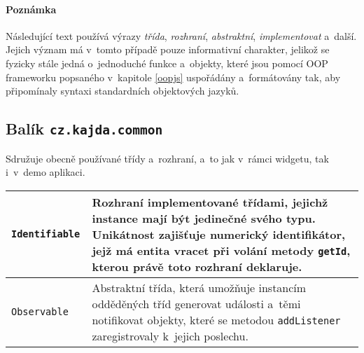 			\paragraph{Poznámka} Následující text používá výrazy \emph{třída}, \emph{rozhraní}, \emph{abstraktní}, \emph{implementovat} a~další. Jejich význam má v~tomto případě pouze informativní charakter, jelikož se fyzicky stále jedná o~jednoduché funkce a~objekty, které jsou pomocí OOP frameworku popsaného v~kapitole \ref{oopjs} uspořádány a~formátovány tak, aby připomínaly syntaxi standardních objektových jazyků.
			
		
			\pagebreak
			\subsection{Balík {\tt cz.kajda.common}}
				Sdružuje obecně používané třídy a~rozhraní, a~to jak v~rámci widgetu, tak i~v~demo aplikaci.
				\begin{longtable}{|p{}p{}|}
					\hline
					\tt Identifiable & Rozhraní implementované třídami, jejichž instance mají být jedinečné svého typu. Unikátnost zajišťuje numerický identifikátor, jejž má entita vracet při volání metody {\tt getId}, kterou právě toto rozhraní deklaruje.\\
					\hline
					{\tt Observable} & Abstraktní třída, která umožňuje instancím odděděných tříd generovat události a~těmi notifikovat objekty, které se metodou {\tt addListener}  zaregistrovaly k~jejich poslechu.\\
					\hline
				\end{longtable}				
				
